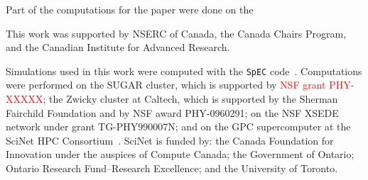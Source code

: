 \documentclass[aps,
prd,
amsmath,
amssymb,
twocolumn,
floatfix,
groupedaddress]{revtex4-1}
\newcommand{\red}{\textcolor{red}}
\begin{document}
Part of the computations for the paper
were done on the

This work was supported by 
NSERC of Canada, the Canada Chairs Program, 
and the Canadian Institute for Advanced Research.

Simulations used in this work
were computed with the \texttt{SpEC} code~\cite{spec}.  Computations
were performed on the  SUGAR cluster, which is supported by \red{NSF grant PHY-XXXXX}; the Zwicky cluster at Caltech, which is supported by
the Sherman Fairchild Foundation and by NSF award PHY-0960291; on the
NSF XSEDE network under grant TG-PHY990007N; and on the GPC
supercomputer at the SciNet HPC Consortium~\cite{scinet}. SciNet is
funded by: the Canada Foundation for Innovation under the auspices of
Compute Canada; the Government of Ontario; Ontario Research
Fund--Research Excellence; and the University of Toronto.



\FloatBarrier


\end{document}
